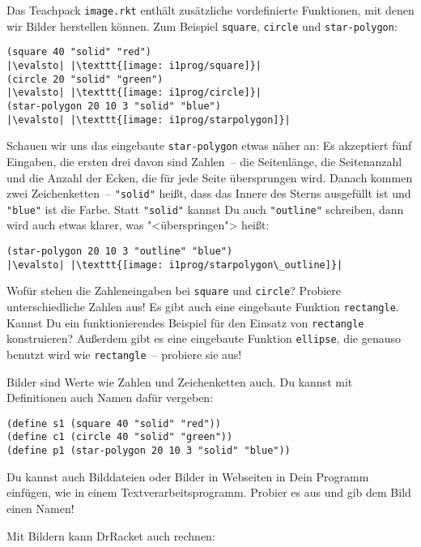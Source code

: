 Das Teachpack \texttt{image.rkt} enthält zusätzliche vordefinierte
Funktionen, mit denen wir Bilder herstellen können.  Zum Beispiel
\lstinline{square}, \lstinline{circle} und \lstinline{star-polygon}:
%
\begin{lstlisting}
(square 40 "solid" "red")
|\evalsto| |\texttt{[image: i1prog/square]}|
(circle 20 "solid" "green")
|\evalsto| |\texttt{[image: i1prog/circle]}|
(star-polygon 20 10 3 "solid" "blue")
|\evalsto| |\texttt{[image: i1prog/starpolygon]}|
\end{lstlisting}
%
Schauen wir uns das eingebaute \lstinline{star-polygon} etwas näher an:
Es akzeptiert fünf Eingaben, die ersten drei davon sind Zahlen~-- die
Seitenlänge, die Seitenanzahl und die Anzahl der Ecken, die für jede
Seite übersprungen wird.  Danach kommen zwei Zeichenketten~--
\lstinline{"solid"} heißt, dass das Innere des Sterns ausgefüllt ist und
\lstinline{"blue"} ist die Farbe.  Statt \lstinline{"solid"} kannst Du auch
\lstinline{"outline"} schreiben, dann wird auch etwas klarer, was
"<überspringen"> heißt:
%
\begin{lstlisting}
(star-polygon 20 10 3 "outline" "blue")
|\evalsto| |\texttt{[image: i1prog/starpolygon\_outline]}|
\end{lstlisting}
%
\begin{aufgabeinline}
  Wofür stehen die Zahleneingaben bei \lstinline{square} und
  \lstinline{circle}?  Probiere unterschiedliche Zahlen aus!  Es gibt
  auch eine eingebaute Funktion \lstinline{rectangle}.  Kannst Du ein
  funktionierendes Beispiel für den Einsatz von \lstinline{rectangle}
  konstruieren?  Außerdem gibt es eine eingebaute Funktion
  \lstinline{ellipse}, die genauso benutzt wird wie \lstinline{rectangle}~--
  probiere sie aus!
\end{aufgabeinline}
%
Bilder sind Werte wie Zahlen und Zeichenketten auch.  Du kannst
mit Definitionen auch Namen dafür vergeben:
%
\begin{lstlisting}
(define s1 (square 40 "solid" "red"))
(define c1 (circle 40 "solid" "green"))
(define p1 (star-polygon 20 10 3 "solid" "blue"))
\end{lstlisting}
%
\begin{aufgabeinline}
  Du kannst auch Bilddateien oder Bilder in Webseiten in Dein Programm
  einfügen, wie in einem Textverarbeitsprogramm.  Probier es aus und
  gib dem Bild einen Namen!
\end{aufgabeinline}
%
Mit Bildern kann DrRacket auch rechnen:\label{function:beside-above}
